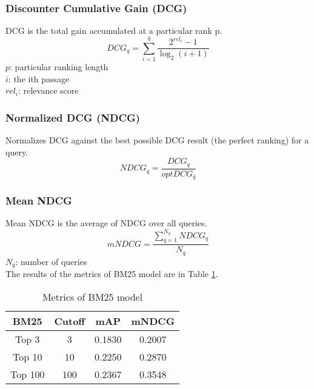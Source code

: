 \subsubsection{Discounter Cumulative Gain (DCG)}
DCG is the total gain accumulated at a particular rank p.
\begin{equation}
    D C G_q=\sum_{i=1}^q \frac{2^{r e l_i}-1}{\log _2(i+1)}
\end{equation}
$p$: particular ranking length\\
$i$: the ith passage\\
$rel_i$: relevance score
\subsubsection{Normalized DCG (NDCG)}
Normalizes DCG against the best possible DCG result (the  perfect ranking) for a query.
\begin{equation}
    N D C G_q=\frac{D C G_q}{o p t D C G_q}
\end{equation}
\subsubsection{Mean NDCG}
Mean NDCG is the average of NDCG over all queries.
\begin{equation}
    m NDCG=\frac{\sum_{q=1}^{N_q} N D C G_q}{N_q}
\end{equation}
$N_q$: number of queries\\
The results of the metrics of BM25 model are in Table \ref{tab:bm25}.

\begin{table}[ht]
    \centering
    \caption{Metrics of BM25 model}
    \label{tab:bm25}
    \begin{tabular}{|c|c|c|c|}
        \hline
        BM25 & Cutoff & mAP & mNDCG \\
        \hline
        Top 3 & 3 & 0.1830 & 0.2007 \\
        \hline
        Top 10 & 10 & 0.2250 & 0.2870 \\
        \hline
        Top 100 & 100 & 0.2367 & 0.3548 \\
        \hline
    \end{tabular}
\end{table}